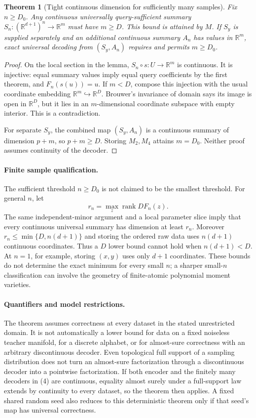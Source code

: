 \documentclass[11pt]{article}
\newtheorem{theorem}{Theorem}
\newcommand{\R}{\mathbb R}
\newcommand{\rank}{\operatorname{rank}}
\begin{document}
\begin{theorem}[Tight continuous dimension for sufficiently many samples]
Fix $n\ge D_0$. Any continuous universally query-sufficient summary
$S_n:(\R^{d+1})^n\to\R^m$ must have $m\ge D$. This bound is attained
by $M$. If $S_y$ is supplied separately and an additional continuous
summary $A_n$ has values in $\R^m$, exact universal decoding from
$(S_y,A_n)$ requires and permits $m\ge D_0$.
\end{theorem}
\begin{proof}
On the local section in the lemma, $S_n\circ s:U\to\R^m$ is
continuous. It is injective: equal summary values imply equal query
coefficients by the first theorem, and $F_n(s(u))=u$.
If $m<D$, compose this injection with the usual coordinate embedding
$\R^m\hookrightarrow\R^D$. Brouwer's invariance of domain says its
image is open in $\R^D$, but it lies in an $m$-dimensional coordinate
subspace with empty interior. This is a contradiction.

For separate $S_y$, the combined map $(S_y,A_n)$ is a continuous
summary of dimension $p+m$, so $p+m\ge D$. Storing $M_2,M_4$
attains $m=D_0$. Neither proof assumes continuity of the decoder.
\end{proof}

\paragraph{Finite sample qualification.}
The sufficient threshold $n\ge D_0$ is not claimed to be the smallest
threshold. For general $n$, let
\[
 r_n=\max_z\rank DF_n(z).
\]
The same independent-minor argument and a local parameter slice imply
that every continuous universal summary has dimension at least $r_n$.
Moreover $r_n\le\min\{D,n(d+1)\}$ and storing the ordered raw data
uses $n(d+1)$ continuous coordinates. Thus a $D$ lower bound cannot
hold when $n(d+1)<D$. At $n=1$, for example, storing $(x,y)$ uses
only $d+1$ coordinates. These bounds do not determine the exact
minimum for every small $n$; a sharper small-$n$ classification can
involve the geometry of finite-atomic polynomial moment varieties.

\paragraph{Quantifiers and model restrictions.}
The theorem assumes correctness at every dataset in the stated
unrestricted domain. It is not automatically a lower bound for data
on a fixed noiseless teacher manifold, for a discrete alphabet, or
for almost-sure correctness with an arbitrary discontinuous decoder.
Even topological full support of a sampling distribution does not turn
an almost-sure factorization through a discontinuous decoder into a
pointwise factorization. If both encoder and the finitely many
decoders in (4) are continuous, equality almost surely under a
full-support law extends by continuity to every dataset, so the
theorem then applies. A fixed shared random seed also reduces to this
deterministic theorem only if that seed's map has universal correctness.
\end{document}
